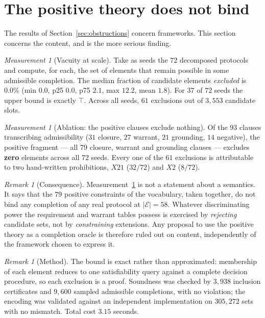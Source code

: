 \documentclass[11pt]{article}
\theoremstyle{definition}
\theoremstyle{plain}
\theoremstyle{remark}
\newtheorem{measurement}[definition]{Measurement}
\newtheorem{remark}[definition]{Remark}
\newcommand{\El}{\mathcal{E}}
\begin{document}
\section{The positive theory does not bind}\label{sec:vacuity}

The results of Section~\ref{sec:obstructions} concern frameworks. This section
concerns the content, and is the more serious finding.

\begin{measurement}[Vacuity at scale]\label{meas:vacuous58}
Take as seeds the $72$ decomposed protocols and compute, for each, the set of
elements that remain possible in some admissible completion. The median fraction
of candidate elements \emph{excluded} is $0.0\%$ (min $0.0$, p25 $0.0$, p75
$2.1$, max $12.2$, mean $1.8$). For $37$ of $72$ seeds the upper bound is exactly
$\top$. Across all seeds, $61$ exclusions out of $3{,}553$ candidate slots.
\end{measurement}

\begin{measurement}[Ablation: the positive clauses exclude nothing]\label{meas:ablation58}
Of the $93$ clauses transcribing admissibility ($31$ closure, $27$ warrant, $21$
grounding, $14$ negative), the positive fragment --- all $79$ closure, warrant
and grounding clauses --- excludes \textbf{zero} elements across all $72$ seeds.
Every one of the $61$ exclusions is attributable to two hand-written
prohibitions, $X21$ ($32/72$) and $X2$ ($8/72$).
\end{measurement}


\begin{remark}[Consequence]
Measurement~\ref{meas:ablation58} is not a statement about a semantics. It says
that the $79$ positive constraints of the vocabulary, taken together, do not
bind any completion of any real protocol at $|\El| = 58$. Whatever discriminating
power the requirement and warrant tables possess is exercised by
\emph{rejecting} candidate sets, not by \emph{constraining} extensions. Any
proposal to use the positive theory as a completion oracle is therefore ruled out
on content, independently of the framework chosen to express it.
\end{remark}

\begin{remark}[Method]
The bound is exact rather than approximated: membership of each element reduces
to one satisfiability query against a complete decision procedure, so each
exclusion is a proof. Soundness was checked by $3{,}938$ inclusion certificates
and $9{,}600$ sampled admissible completions, with no violation; the encoding was
validated against an independent implementation on $305{,}272$ sets with no
mismatch. Total cost $3.15$ seconds.
\end{remark}
\end{document}
